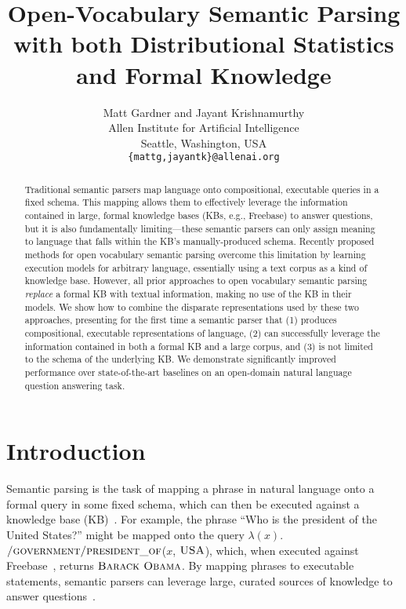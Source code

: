 \documentclass[11pt,letterpaper]{article}
\title{Open-Vocabulary Semantic Parsing\\with both Distributional
Statistics and Formal Knowledge}
\author{Matt Gardner and Jayant Krishnamurthy\\
Allen Institute for Artificial Intelligence\\
Seattle, Washington, USA\\
{\tt \{mattg,jayantk\}@allenai.org}}
\date{}
\newcommand{\formalpredicate}[1]{{\small \ensuremath{\textsc{#1}}}}
\begin{document}
\maketitle

\begin{abstract}

Traditional semantic parsers map language onto compositional, executable queries in a fixed
schema.  This mapping allows them to effectively leverage the information contained in large,
formal knowledge bases (KBs, e.g., Freebase) to answer questions, but it is also fundamentally
limiting---these semantic parsers can only assign meaning to language that falls within the KB's
manually-produced schema.  Recently proposed methods for open vocabulary semantic parsing
overcome this limitation by learning execution models for arbitrary language, essentially using a
text corpus as a kind of knowledge base.  However, all prior approaches to open vocabulary
semantic parsing \emph{replace} a formal KB with textual information, making no use of the KB in
their models.  We show how to combine the disparate representations used by these two approaches,
presenting for the first time a semantic parser that (1) produces compositional, executable
representations of language, (2) can successfully leverage the information contained in both a
formal KB and a large corpus, and (3) is not limited to the schema of the underlying KB.  We
demonstrate significantly improved performance over state-of-the-art baselines on an open-domain
natural language question answering task.

\end{abstract}

\section{Introduction}

Semantic parsing is the task of mapping a phrase in natural language onto a formal query in some
fixed schema, which can then be executed against a knowledge
base (KB)~\cite{zelle-1996-geoquery,zettlemoyer-2005-ccg}.  For example, the phrase ``Who is the
president of the United States?'' might be mapped onto the query
$\lambda(x).$\formalpredicate{/government/president\_of}($x$, \formalpredicate{USA}), which, when
executed against Freebase~\cite{freebase-2008-bollacker}, returns \formalpredicate{Barack Obama}.
By mapping phrases to executable statements, semantic parsers can leverage large, curated sources
of knowledge to answer questions~\cite{berant-2013-semantic-parsing-qa}.
\end{document}
